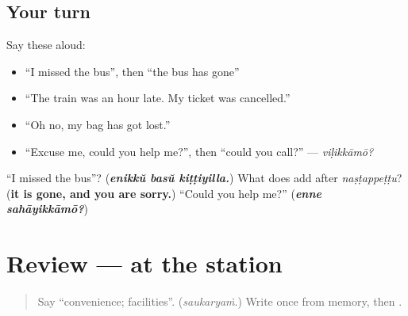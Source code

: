 \subsection*{Your turn}
Say these aloud:

\begin{itemize}
\raggedright
  \item \textquotedblleft{}I missed the bus\textquotedblright{}, then \textquotedblleft{}the bus has gone\textquotedblright{}
  \item \textquotedblleft{}The train was an hour late. My ticket was cancelled.\textquotedblright{}
  \item \textquotedblleft{}Oh no, my bag has got lost.\textquotedblright{}
  \item \textquotedblleft{}Excuse me, could you help me?\textquotedblright{}, then \textquotedblleft{}could you call?\textquotedblright{} — \emph{viḷikkāmō?}
\end{itemize}

\begin{tcolorbox}[breakable,colback=teal!4,colframe=teal!35!black,title={Before you move on}]
\textquotedblleft{}I missed the bus\textquotedblright{}? (\emph{\textbf{enikkŭ basŭ kiṭṭiyilla.}}) What does \textbf{} add after \emph{naṣṭappeṭṭu}? (\textbf{it is gone, and you are sorry.}) \textquotedblleft{}Could you help me?\textquotedblright{} (\emph{\textbf{enne sahāyikkāmō?}})
\end{tcolorbox}
\section[(review)]{Review — at the station}

\label{lesson:ML-R344-at-the-station}



\begin{quote}
Say \textquotedblleft{}convenience; facilities\textquotedblright{}. (\emph{saukaryaṁ}.) Write \textbf{} once from memory, then \textbf{}.
\end{quote}

